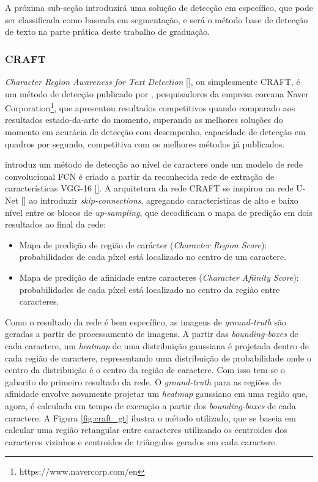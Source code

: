 A próxima sub-seção introduzirá uma solução de detecção em específico, que pode ser classificada como baseada em segmentação, e será o método base de detecção 
de texto na parte prática deste trabalho de graduação.


\subsubsection{CRAFT}\label{craft}
\textit{Character Region Awareness for Text Detection} [], ou simplesmente CRAFT, é um método de detecção publicado por \citeauthor{CRAFT}, 
pesquisadores da empresa coreana Naver Corporation\footnote{https://www.navercorp.com/en}, que apresentou resultados competitivos quando comparado 
aos resultados estado-da-arte do momento, superando as melhores soluções do momento em acurácia de detecção com desempenho, capacidade de detecção em quadros 
por segundo, competitiva com os melhores métodos já publicados.
	
\citeauthor{CRAFT} introduz um método de detecção ao nível de caractere onde um modelo de rede convolucional FCN é criado a partir da reconhecida rede de 
extração de características VGG-16 []. A arquitetura da rede CRAFT se inspirou na rede U-Net [] ao introduzir 
\textit{skip-connections}, agregando características de alto e baixo nível entre os blocos de \textit{up-sampling}, que decodificam o mapa de predição em 
dois resultados ao final da rede:

\begin{itemize}
    \item {Mapa de predição de região de carácter (\textit{Character Region Score}): probabilidades de cada píxel está localizado no centro de um caractere}.

    \item {Mapa de predição de afinidade entre caracteres (\textit{Character Afiinity Score}): probabilidades de cada píxel está localizado no centro da região entre caracteres}.
\end{itemize}

Como o resultado da rede é bem específico, as imagens de \textit{ground-truth} são geradas a partir de processamento de imagens. A partir das 
\textit{bounding-boxes} de cada caractere, um \textit{heatmap} de uma distribuição gaussiana é projetada dentro de cada região de caractere, representando 
uma distribuição de probabilidade onde o centro da distribuição é o centro da região de caractere. Com isso tem-se o gabarito do primeiro resultado da rede. 
O \textit{ground-truth} para as regiões de afinidade envolve novamente projetar um \textit{heatmap} gaussiano em uma região que, agora, é calculada em tempo de 
execução a partir dos \textit{bounding-boxes} de cada caractere. A Figura \ref{fig:craft_gt}  ilustra o método utilizado, que se baseia em calcular uma 
região retangular entre caracteres utilizando os centroides dos caracteres vizinhos e centroides de triângulos gerados em cada caractere.

